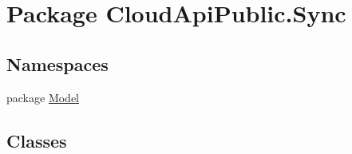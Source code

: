 \hypertarget{namespace_cloud_api_public_1_1_sync}{\section{Package Cloud\-Api\-Public.\-Sync}
\label{namespace_cloud_api_public_1_1_sync}
}
\subsection*{Namespaces}
\begin{DoxyCompactItemize}
\item 
package \hyperlink{namespace_cloud_api_public_1_1_sync_1_1_model}{Model}
\end{DoxyCompactItemize}
\subsection*{Classes}
